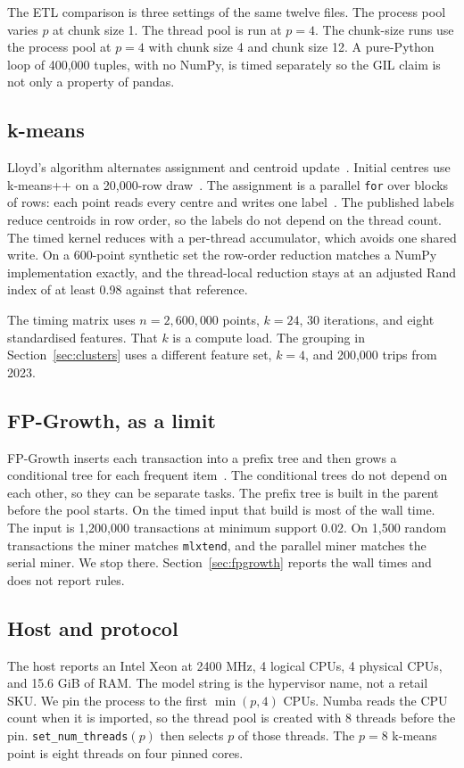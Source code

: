\documentclass[11pt,a4paper]{article}
\begin{document}
The ETL comparison is three settings of the same twelve files. The process pool varies $p$ at chunk size 1. The thread pool is run at $p = 4$. The chunk-size runs use the process pool at $p = 4$ with chunk size 4 and chunk size 12. A pure-Python loop of 400{,}000 tuples, with no NumPy, is timed separately so the GIL claim is not only a property of pandas.

\subsection{k-means}
Lloyd's algorithm alternates assignment and centroid update~\cite{lloyd1982}. Initial centres use k-means++ on a 20{,}000-row draw~\cite{arthur2007}. The assignment is a parallel \texttt{for} over blocks of rows: each point reads every centre and writes one label~\cite{lam2015}. The published labels reduce centroids in row order, so the labels do not depend on the thread count. The timed kernel reduces with a per-thread accumulator, which avoids one shared write. On a 600-point synthetic set the row-order reduction matches a NumPy implementation exactly, and the thread-local reduction stays at an adjusted Rand index of at least 0.98 against that reference.

The timing matrix uses $n = 2{,}600{,}000$ points, $k = 24$, 30 iterations, and eight standardised features. That $k$ is a compute load. The grouping in Section~\ref{sec:clusters} uses a different feature set, $k = 4$, and 200{,}000 trips from 2023.

\subsection{FP-Growth, as a limit}
FP-Growth inserts each transaction into a prefix tree and then grows a conditional tree for each frequent item~\cite{han2000}. The conditional trees do not depend on each other, so they can be separate tasks. The prefix tree is built in the parent before the pool starts. On the timed input that build is most of the wall time. The input is 1{,}200{,}000 transactions at minimum support 0.02. On 1{,}500 random transactions the miner matches \texttt{mlxtend}, and the parallel miner matches the serial miner. We stop there. Section~\ref{sec:fpgrowth} reports the wall times and does not report rules.

\subsection{Host and protocol}
The host reports an Intel Xeon at 2400 MHz, 4 logical CPUs, 4 physical CPUs, and 15.6 GiB of RAM. The model string is the hypervisor name, not a retail SKU. We pin the process to the first $\min(p, 4)$ CPUs. Numba reads the CPU count when it is imported, so the thread pool is created with 8 threads before the pin. \texttt{set\_num\_threads}$(p)$ then selects $p$ of those threads. The $p = 8$ k-means point is eight threads on four pinned cores.
\end{document}
